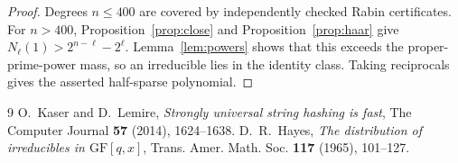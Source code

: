 \documentclass[10pt]{article}
\begin{document}
\begin{proof}
Degrees $n\leq400$ are covered by independently checked Rabin certificates.
For $n>400$, Proposition~\ref{prop:close} and
Proposition~\ref{prop:haar} give
$N_\ell(1)>2^{n-\ell}-2^\ell$.  Lemma~\ref{lem:powers} shows that this exceeds
the proper-prime-power mass, so an irreducible lies in the identity class.
Taking reciprocals gives the asserted half-sparse polynomial.
\end{proof}

\begin{thebibliography}{9}\small
{} O.~Kaser and D.~Lemire,
\emph{Strongly universal string hashing is fast},
The Computer Journal \textbf{57} (2014), 1624--1638.
 D.~R.~Hayes,
\emph{The distribution of irreducibles in $\mathrm{GF}[q,x]$},
Trans. Amer. Math. Soc. \textbf{117} (1965), 101--127.
\end{thebibliography}
\end{document}
